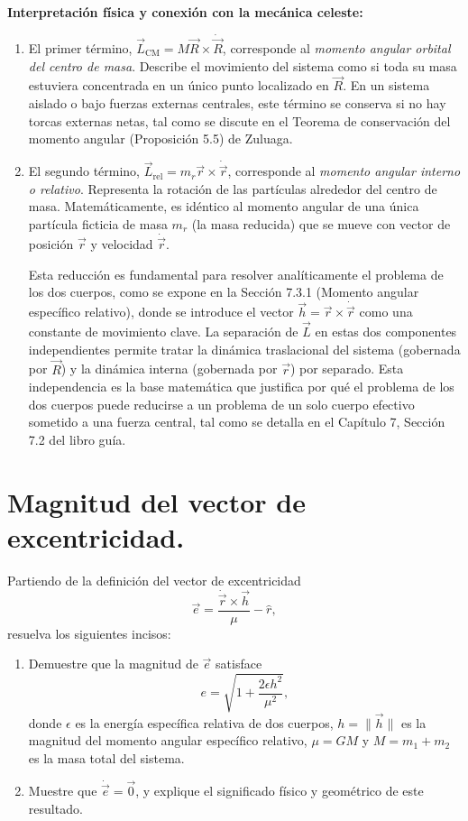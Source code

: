 \documentclass[12pt, a4paper]{article}
\begin{document}
\textbf{Interpretación física y conexión con la mecánica celeste:}
\begin{enumerate}
    \item El primer término, $\vec{L}_{\text{CM}} = M \vec{R} \times \dot{\vec{R}}$, corresponde al \textit{momento angular orbital del centro de masa}. Describe el movimiento del sistema como si toda su masa estuviera concentrada en un único punto localizado en $\vec{R}$. En un sistema aislado o bajo fuerzas externas centrales, este término se conserva si no hay torcas externas netas, tal como se discute en el Teorema de conservación del momento angular (Proposición 5.5) de Zuluaga.
    
    \item El segundo término, $\vec{L}_{\text{rel}} = m_r \vec{r} \times \dot{\vec{r}}$, corresponde al \textit{momento angular interno o relativo}. Representa la rotación de las partículas alrededor del centro de masa. Matemáticamente, es idéntico al momento angular de una única partícula ficticia de masa $m_r$ (la masa reducida) que se mueve con vector de posición $\vec{r}$ y velocidad $\dot{\vec{r}}$. 
    
    Esta reducción es fundamental para resolver analíticamente el problema de los dos cuerpos, como se expone en la Sección 7.3.1 (Momento angular específico relativo), donde se introduce el vector $\vec{h} = \vec{r} \times \dot{\vec{r}}$ como una constante de movimiento clave. La separación de $\vec{L}$ en estas dos componentes independientes permite tratar la dinámica traslacional del sistema (gobernada por $\vec{R}$) y la dinámica interna (gobernada por $\vec{r}$) por separado. Esta independencia es la base matemática que justifica por qué el problema de los dos cuerpos puede reducirse a un problema de un solo cuerpo efectivo sometido a una fuerza central, tal como se detalla en el Capítulo 7, Sección 7.2 del libro guía.
\end{enumerate}


\section{Magnitud del vector de excentricidad.} 

Partiendo de la definición del vector de excentricidad
$$\vec{e} = \frac{\dot{\vec{r}} \times \vec{h}}{\mu} - \hat{r},$$
resuelva los siguientes incisos:
\begin{enumerate}
    \item[a)] Demuestre que la magnitud de $\vec{e}$ satisface
    $$e = \sqrt{1 + \frac{2\epsilon h^2}{\mu^2}},$$
    donde $\epsilon$ es la energía específica relativa de dos cuerpos, $h = \|\vec{h}\|$ es la magnitud del momento angular específico relativo, $\mu = GM$ y $M = m_1 + m_2$ es la masa total del sistema.
    \item[b)] Muestre que $\dot{\vec{e}} = \vec{0}$,
    y explique el significado físico y geométrico de este resultado.
\end{enumerate}
\end{document}
